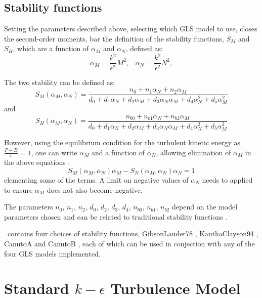 \subsection{Stability functions}

Setting the parameters described above, \ie selecting which GLS model to use, closes the second-order 
moments, bar the definition of the stability functions, $S_M$ and $S_H$, 
which are a function of $\alpha_M$ and $\alpha_N$, defined as:
\begin{equation*}
\alpha_M=\frac{k^2}{\epsilon^2}M^2, \;\;\;
\alpha_N=\frac{k^2}{\epsilon^2}N^2,
\end{equation*}

The two stability can be defined as:
\begin{equation*}
S_M(\alpha_M,\alpha_N) = \frac{n_0+n_1\alpha_N+n_2\alpha_M}{d_0+d_1\alpha_N+d_2\alpha_M+d_3\alpha_N\alpha_M+d_4\alpha_N^2+d_5\alpha_M^2}
\end{equation*}
and
\begin{equation*}
S_H(\alpha_M,\alpha_N) = \frac{n_{b0}+n_{b1}\alpha_N+n_{b2}\alpha_M}{d_0+d_1\alpha_N+d_2\alpha_M+d_3\alpha_N\alpha_M+d_4\alpha_N^2+d_5\alpha_M^2}
\end{equation*}

However, using the equilibrium condition for the turbulent kinetic energy as $\frac{P+B}{\epsilon}=1$, one can write
$\alpha_M$ and a function of $\alpha_N$, allowing elimination of $\alpha_M$ in the above equations \citep{umlauf2005}:
\begin{equation*}
S_M(\alpha_M,\alpha_N)\alpha_M - S_N(\alpha_M,\alpha_N)\alpha_N=1
\end{equation*}
elementing some of the terms. A limit on negative values of $\alpha_N$ needs to applied to ensure $\alpha_M$ does not also become negative. 

The parameters $n_0$, $n_1$, $n_2$, $d_0$, $d_2$, $d_3$, $d_4$, $n_{b0}$, $n_{b1}$, $n_{b2}$ depend on
the model parameters chosen and can be related to traditional stability functions \citep{umlauf2005}.

\fluidity\ contains four choices of stability functions, GibsonLauder78 \citep{gibson1978}, KanthaClayson94 \citep{kantha1994}, CanutoA and CanutoB \citep{canuto2001}, each of which can be used in conjection with any of the four
GLS models implemented.



\section{Standard $k-\epsilon$ Turbulence Model}\label{Sect:kepsilon}


